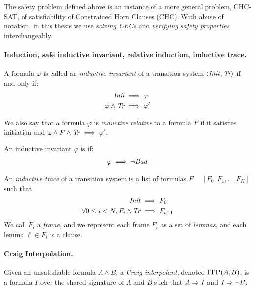 The safety problem defined above is an instance of a more general problem,
CHC-SAT, of satisfiability of Constrained Horn Clauses (CHC). With abuse of
notation, in this thesis we use \textit{solving CHCs} and \textit{verifying
  safety properties} interchangeably.

\paragraph{Induction, safe inductive invariant, relative induction, inductive trace.}
A formula $\varphi$ is called an \emph{inductive invariant} of a transition
system $\langle \mathit{Init}, \mathit{Tr}\rangle$ if and only if:
\begin{align}
  \mathit{Init} &\implies \varphi\\
  \varphi \land \mathit{Tr} &\implies \varphi'
\end{align}

We also say that a formula $\varphi$ is \emph{inductive relative} to a formula
$F$ if it satisfies initiation and $\varphi \land F \land \mathit{Tr} \implies \varphi'$.

An inductive invariant $\varphi$ is \safe if:
\begin{align}
  \varphi \implies \lnot \mathit{Bad}
\end{align}

An \emph{inductive trace} of a transition system is a list of formulas $F = [F_0, F_1, \dots, F_N]$ such
that
\begin{align}
  \mathit{Init} &\implies F_0 \\
  \forall 0 \leq i < N , F_i \land \mathit{Tr} &\implies F_{i+1}
\end{align}
We call $F_i$ a \emph{frame}, and we represent each frame $F_i$ as a set of \emph{lemmas}, and each lemma $\ell \in
F_i$ is a clause.

\paragraph{Craig Interpolation.} Given an unsatisfiable formula $A \land B$, a \emph{Craig
interpolant}, denoted $\textsc{ITP}(A,B)$, is a formula $I$ over the shared signature of
$A$ and $B$ such that $A \Rightarrow I$ and $I \Rightarrow \neg B$.

